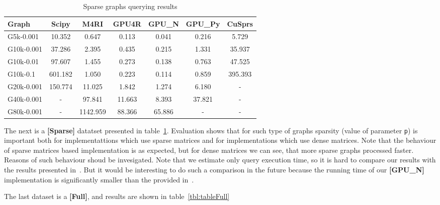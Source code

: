 {\setlength{\tabcolsep}{0.4em}
\begin{table}[H]
\caption{Sparse graphs querying results}
\label{tbl:tableSparse}
\begin{tabular}{| l | c | c | c | c | c | c | }
    \hline
    Graph              & Scipy   & M4RI     & GPU4R  & GPU\_N & GPU\_Py & CuSprs  \\
    \hline
    \hline
    \small{G5k-0.001}  & 10.352  & 0.647    & 0.113  & 0.041  & 0.216   & 5.729   \\
    \small{G10k-0.001} & 37.286  & 2.395    & 0.435  & 0.215  & 1.331   & 35.937  \\
    \small{G10k-0.01}  & 97.607  & 1.455    & 0.273  & 0.138  & 0.763   & 47.525  \\
    \small{G10k-0.1}   & 601.182 & 1.050    & 0.223  & 0.114  & 0.859   & 395.393 \\
    \small{G20k-0.001} & 150.774 & 11.025   & 1.842  & 1.274  & 6.180   & -       \\
    \small{G40k-0.001} & -       & 97.841   & 11.663 & 8.393  & 37.821  & -       \\
    \small{G80k-0.001} & -       & 1142.959 & 88.366 & 65.886 & -       & -       \\
    \hline
  \end{tabular}
\end{table}
}

The next is a \textbf{[Sparse]} datatset presented in table~\ref{tbl:tableSparse}.
Evaluation shows that for such type of graphs sparsity (value of parameter \texttt{p}) is important both for implementattions which use sparse matrices and for implementations which use dense matrices.
Note that the behaviour of sparse matrices based implementation is as expected, but for dense matrices we can see, that more sparse graphs processed faster.
Reasons of such behaviour shoud be invesigated.
Note that we estimate only query execution time, so it is hard to compare our results with the results presented in~\cite{fan2018scaling}.
But it would be interesting to do such a comparison in the future because the running time of our \textbf{[GPU\_N]} implementation is significantly smaller than the provided in~\cite{fan2018scaling}.

The last dataset is a \textbf{[Full]}, and results are shown in table~\ref{tbl:tableFull}


